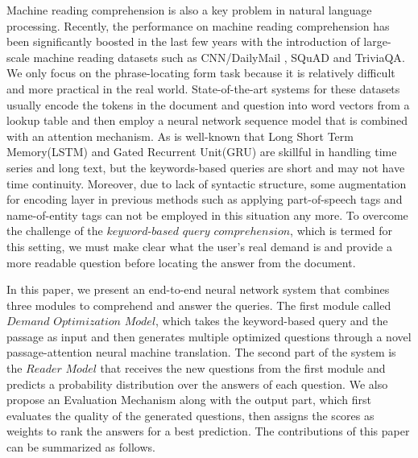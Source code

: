\documentclass[sigconf]{acmart}
\begin{document}
Machine reading comprehension is also a key problem in natural language processing. Recently, the performance on machine reading comprehension has been significantly boosted in the last few years with the introduction of large-scale machine reading datasets such as CNN/DailyMail \cite{hermann2015teaching}, SQuAD\cite{rajpurkar2016squad} and TriviaQA\cite{joshi2017triviaqa}. We only focus on the phrase-locating form task because it is relatively difficult and more practical in the real world. State-of-the-art systems\cite{seo2016bidirectional}\cite{pan2017memen}\cite{rnet} for these datasets usually encode the tokens in the document and question into word vectors from a lookup table and then employ a neural network sequence model that is combined with an attention mechanism. As is well-known that Long Short Term Memory(LSTM)\cite{hochreiter1997long} and Gated Recurrent Unit(GRU)\cite{cho2014learning} are skillful in handling time series and long text, but the keywords-based queries are short and may not have time continuity. Moreover, due to lack of syntactic structure, some augmentation for encoding layer in previous methods\cite{pan2017memen}\cite{liu2017structural} such as applying part-of-speech tags and name-of-entity tags can not be employed in this situation any more. To overcome the challenge of the $keyword$-$based$ $query$ $comprehension$, which is termed for this setting, we must make clear what the user's real demand is and provide a more readable question before locating the answer from the document.

In this paper, we present an end-to-end neural network system that combines three modules to comprehend and answer the queries. The first module called $Demand$ $Optimization$ $Model$, which takes the keyword-based query and the passage as input and then generates multiple optimized questions through a novel passage-attention neural machine translation. The second part of the system is the $Reader$ $Model$ that receives the new questions from the first module and predicts a probability distribution over the answers of each question. We also propose an Evaluation Mechanism along with the output part, which first evaluates the quality of the generated questions, then assigns the scores as weights to rank the answers for a best prediction. The contributions of this paper can be summarized as follows.
\end{document}
